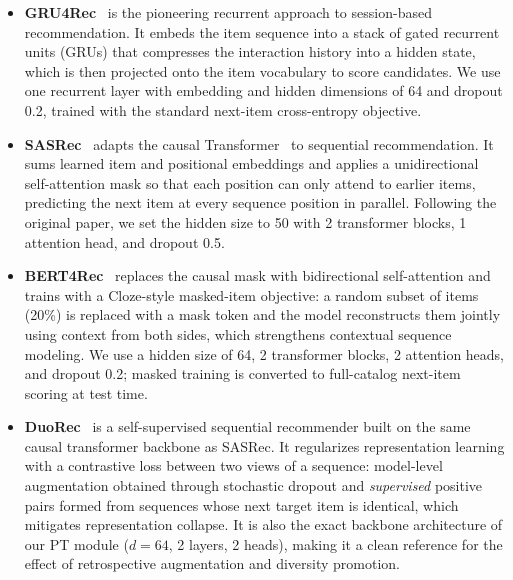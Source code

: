 \begin{itemize}
    \item \textbf{GRU4Rec}~\cite{hidasi2016session} is the pioneering recurrent approach to session-based recommendation. It embeds the item sequence into a stack of gated recurrent units (GRUs) that compresses the interaction history into a hidden state, which is then projected onto the item vocabulary to score candidates. We use one recurrent layer with embedding and hidden dimensions of 64 and dropout 0.2, trained with the standard next-item cross-entropy objective.
    \item \textbf{SASRec}~\cite{kang2018self} adapts the causal Transformer~\cite{vaswani2017} to sequential recommendation. It sums learned item and positional embeddings and applies a unidirectional self-attention mask so that each position can only attend to earlier items, predicting the next item at every sequence position in parallel. Following the original paper, we set the hidden size to 50 with 2 transformer blocks, 1 attention head, and dropout 0.5.
    \item \textbf{BERT4Rec}~\cite{sun2019bert4rec} replaces the causal mask with bidirectional self-attention and trains with a Cloze-style masked-item objective: a random subset of items (20\%) is replaced with a mask token and the model reconstructs them jointly using context from both sides, which strengthens contextual sequence modeling. We use a hidden size of 64, 2 transformer blocks, 2 attention heads, and dropout 0.2; masked training is converted to full-catalog next-item scoring at test time.
    \item \textbf{DuoRec}~\cite{wang2022duorec} is a self-supervised sequential recommender built on the same causal transformer backbone as SASRec. It regularizes representation learning with a contrastive loss between two views of a sequence: model-level augmentation obtained through stochastic dropout and \emph{supervised} positive pairs formed from sequences whose next target item is identical, which mitigates representation collapse. It is also the exact backbone architecture of our PT module ($d=64$, 2 layers, 2 heads), making it a clean reference for the effect of retrospective augmentation and diversity promotion.

\end{itemize}
